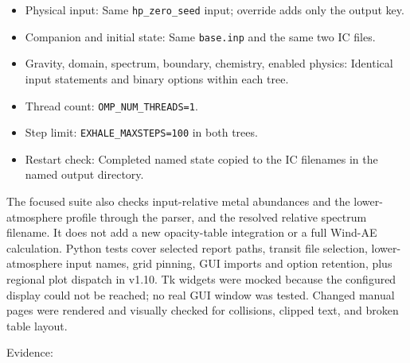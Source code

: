 \documentclass[english,a4paper]{my_memo}
\providecommand{\tightlist}{\setlength{\itemsep}{0pt}\setlength{\parskip}{0pt}}
\begin{document}
\begin{itemize}
\tightlist
\item
  Physical input: Same \texttt{hp\_zero\_seed} input; override adds only the output key.
\item
  Companion and initial state: Same \texttt{base.inp} and the same two IC files.
\item
  Gravity, domain, spectrum, boundary, chemistry, enabled physics: Identical input statements and binary options within each tree.
\item
  Thread count: \texttt{OMP\_NUM\_THREADS=1}.
\item
  Step limit: \texttt{EXHALE\_MAXSTEPS=100} in both trees.
\item
  Restart check: Completed named state copied to the IC filenames in the named output directory.
\end{itemize}

The focused suite also checks input-relative metal abundances and the
lower-atmosphere profile through the parser, and the resolved relative
spectrum filename. It does not add a new opacity-table integration or a
full Wind-AE calculation. Python tests cover selected report paths, transit
file selection, lower-atmosphere input names, grid pinning, GUI imports and
option retention, plus regional plot dispatch in v1.10. Tk widgets were
mocked because the configured display could not be reached; no real GUI
window was tested. Changed manual pages were rendered and visually checked
for collisions, clipped text, and broken table layout.

Evidence:
\end{document}
